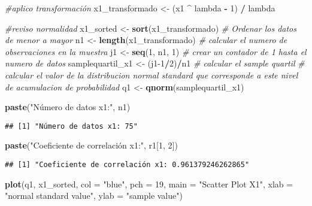\documentclass[
]{article}
\newenvironment{Shaded}{\begin{snugshade}}{\end{snugshade}}
\newcommand{\AttributeTok}[1]{\textcolor[rgb]{0.13,0.29,0.53}{#1}}
\newcommand{\CommentTok}[1]{\textcolor[rgb]{0.56,0.35,0.01}{\textit{#1}}}
\newcommand{\DecValTok}[1]{\textcolor[rgb]{0.00,0.00,0.81}{#1}}
\newcommand{\FunctionTok}[1]{\textcolor[rgb]{0.13,0.29,0.53}{\textbf{#1}}}
\newcommand{\NormalTok}[1]{#1}
\newcommand{\OtherTok}[1]{\textcolor[rgb]{0.56,0.35,0.01}{#1}}
\newcommand{\SpecialCharTok}[1]{\textcolor[rgb]{0.81,0.36,0.00}{\textbf{#1}}}
\newcommand{\StringTok}[1]{\textcolor[rgb]{0.31,0.60,0.02}{#1}}
\begin{document}
\begin{Shaded}
\begin{Highlighting}[]
\CommentTok{\#aplico transformación}
\NormalTok{x1\_transformado }\OtherTok{\textless{}{-}}\NormalTok{ (x1 }\SpecialCharTok{\^{}}\NormalTok{ lambda  }\SpecialCharTok{{-}} \DecValTok{1}\NormalTok{) }\SpecialCharTok{/}\NormalTok{ lambda}

\CommentTok{\#reviso normalidad}
\NormalTok{x1\_sorted }\OtherTok{\textless{}{-}} \FunctionTok{sort}\NormalTok{(x1\_transformado) }\CommentTok{\# Ordenar los datos de menor a mayor}
\NormalTok{n1 }\OtherTok{\textless{}{-}} \FunctionTok{length}\NormalTok{(x1\_transformado) }\CommentTok{\# calcular el numero de observaciones en la muestra}
\NormalTok{j1 }\OtherTok{\textless{}{-}} \FunctionTok{seq}\NormalTok{(}\DecValTok{1}\NormalTok{, n1, }\DecValTok{1}\NormalTok{) }\CommentTok{\# crear un contador de 1 hasta el numero de datos}
\NormalTok{samplequartil\_x1 }\OtherTok{\textless{}{-}}\NormalTok{ (j1}\DecValTok{{-}1}\SpecialCharTok{/}\DecValTok{2}\NormalTok{)}\SpecialCharTok{/}\NormalTok{n1 }\CommentTok{\# calcular el sample quartil }
\CommentTok{\# calcular el valor de la distribucion normal standard que corresponde a este nivel de acumulacion de probabilidad}
\NormalTok{q1 }\OtherTok{\textless{}{-}} \FunctionTok{qnorm}\NormalTok{(samplequartil\_x1)}

\FunctionTok{paste}\NormalTok{(}\StringTok{"Número de datos x1:"}\NormalTok{, n1)}
\end{Highlighting}
\end{Shaded}

\begin{verbatim}
## [1] "Número de datos x1: 75"
\end{verbatim}

\begin{Shaded}
\begin{Highlighting}[]
\FunctionTok{paste}\NormalTok{(}\StringTok{"Coeficiente de correlación x1:"}\NormalTok{, r1[}\DecValTok{1}\NormalTok{, }\DecValTok{2}\NormalTok{])}
\end{Highlighting}
\end{Shaded}

\begin{verbatim}
## [1] "Coeficiente de correlación x1: 0.961379246262865"
\end{verbatim}

\begin{Shaded}
\begin{Highlighting}[]
\FunctionTok{plot}\NormalTok{(q1, x1\_sorted, }\AttributeTok{col =} \StringTok{"blue"}\NormalTok{, }\AttributeTok{pch =} \DecValTok{19}\NormalTok{, }\AttributeTok{main =} \StringTok{"Scatter Plot X1"}\NormalTok{, }\AttributeTok{xlab =} \StringTok{"normal standard value"}\NormalTok{, }\AttributeTok{ylab =} \StringTok{"sample value"}\NormalTok{)}
\end{Highlighting}
\end{Shaded}
\end{document}
